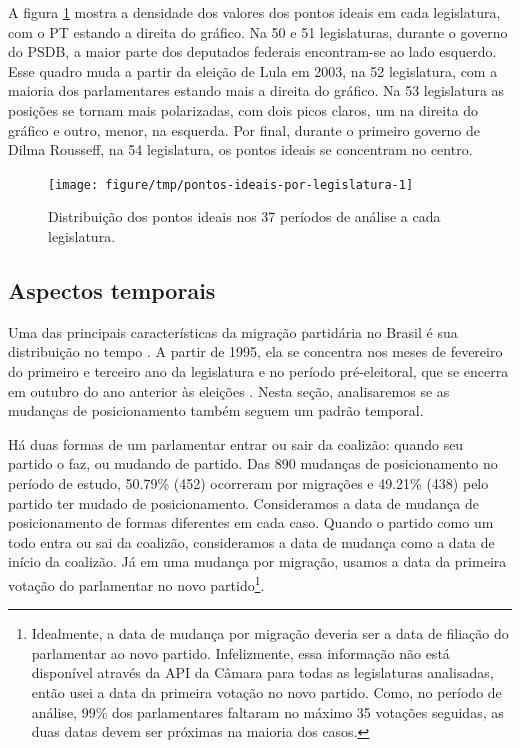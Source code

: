 \documentclass[a4paper,titlepage]{ppgi}\usepackage[]{graphicx}\usepackage[]{color}
\newenvironment{knitrout}{}{} %
\begin{document}
A figura \ref{fig:pontos-ideais-por-legislatura} mostra a densidade dos valores
dos pontos ideais em cada legislatura, com o PT estando a direita do gráfico.
Na 50\textordfeminine{} e 51\textordfeminine{} legislaturas, durante o governo
do PSDB, a maior parte dos deputados federais encontram-se ao lado esquerdo.
Esse quadro muda a partir da eleição de Lula em 2003, na 52\textordfeminine{}
legislatura, com a maioria dos parlamentares estando mais a direita do gráfico.
Na 53\textordfeminine{} legislatura as posições se tornam mais polarizadas, com
dois picos claros, um na direita do gráfico e outro, menor, na esquerda. Por
final, durante o primeiro governo de Dilma Rousseff, na 54\textordfeminine{}
legislatura, os pontos ideais se concentram no centro.

\begin{knitrout}
\color{fgcolor}\begin{figure}
\texttt{[image: figure/tmp/pontos-ideais-por-legislatura-1]} \caption[Distribuição dos pontos ideais nos 37 períodos de análise a cada legislatura]{Distribuição dos pontos ideais nos 37 períodos de análise a cada legislatura.}\label{fig:pontos-ideais-por-legislatura}
\end{figure}


\end{knitrout}

\subsection{Aspectos temporais}
\label{cap:desenvolvimento:aspectos-temporais}



Uma das principais características da migração partidária no Brasil é sua
distribuição no tempo \cite{Araujo2000,Melo2004,Freitas2008}. A partir de 1995,
ela se concentra nos meses de fevereiro do primeiro e terceiro ano da
legislatura e no período pré-eleitoral, que se encerra em outubro do ano
anterior às eleições \cite{Freitas2008,Lei9504/1997}. Nesta seção,
analisaremos se as mudanças de posicionamento também seguem um padrão temporal.

Há duas formas de um parlamentar entrar ou sair da coalizão: quando seu partido
o faz, ou mudando de partido. Das 890 mudanças de
posicionamento no período de estudo,
50.79\% (452)
ocorreram por migrações e
49.21\% (438)
pelo partido ter mudado de posicionamento. Consideramos a data de mudança
de posicionamento de formas diferentes em cada caso. Quando o partido como um
todo entra ou sai da coalizão, consideramos a data de mudança como a data de
início da coalizão. Já em uma mudança por migração, usamos a data da primeira
votação do parlamentar no novo partido\footnote{Idealmente, a data de mudança
por migração deveria ser a data de filiação do parlamentar ao novo partido.
Infelizmente, essa informação não está disponível através da \gls{API} da
Câmara para todas as legislaturas analisadas, então usei a data da primeira
votação no novo partido. Como, no período de análise, 99\% dos parlamentares
faltaram no máximo 35 votações seguidas, as duas datas devem ser próximas na
maioria dos casos.}.
\end{document}

